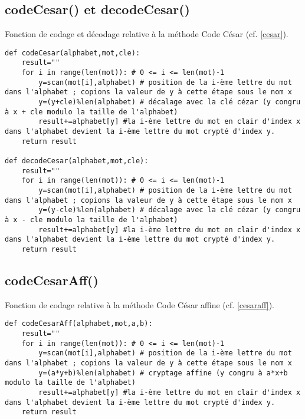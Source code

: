 \documentclass[10pt,a4paper,french]{article}
\begin{document}
\subsection{codeCesar() et decodeCesar()}
Fonction de codage et décodage relative à la méthode Code César (cf. \ref{cesar}).
\begin{lstlisting}
def codeCesar(alphabet,mot,cle):
    result=""
    for i in range(len(mot)): # 0 <= i <= len(mot)-1
        y=scan(mot[i],alphabet) # position de la i-ème lettre du mot dans l'alphabet ; copions la valeur de y à cette étape sous le nom x
        y=(y+cle)%len(alphabet) # décalage avec la clé cézar (y congru à x + cle modulo la taille de l'alphabet)
        result+=alphabet[y] #la i-ème lettre du mot en clair d'index x dans l'alphabet devient la i-ème lettre du mot crypté d'index y. 
    return result
    
def decodeCesar(alphabet,mot,cle):
    result=""
    for i in range(len(mot)): # 0 <= i <= len(mot)-1
        y=scan(mot[i],alphabet) # position de la i-ème lettre du mot dans l'alphabet ; copions la valeur de y à cette étape sous le nom x
        y=(y-cle)%len(alphabet) # décalage avec la clé cézar (y congru à x - cle modulo la taille de l'alphabet)
        result+=alphabet[y] #la i-ème lettre du mot en clair d'index x dans l'alphabet devient la i-ème lettre du mot crypté d'index y. 
    return result
\end{lstlisting}
\subsection{codeCesarAff()}
Fonction de codage relative à la méthode Code César affine (cf. \ref{cesaraff}).
\begin{lstlisting}
def codeCesarAff(alphabet,mot,a,b):
    result=""
    for i in range(len(mot)): # 0 <= i <= len(mot)-1
        y=scan(mot[i],alphabet) # position de la i-ème lettre du mot dans l'alphabet ; copions la valeur de y à cette étape sous le nom x
        y=(a*y+b)%len(alphabet) # cryptage affine (y congru à a*x+b modulo la taille de l'alphabet)
        result+=alphabet[y] #la i-ème lettre du mot en clair d'index x dans l'alphabet devient la i-ème lettre du mot crypté d'index y. 
    return result
\end{lstlisting}
\end{document}

